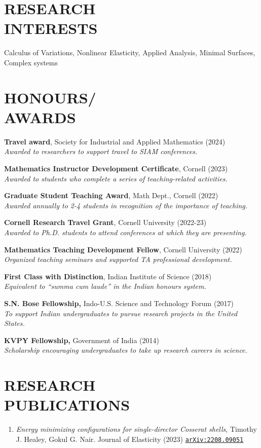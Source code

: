 \documentclass[margin]{res} %
\begin{document}
\begin{resume}
\section{RESEARCH \\ INTERESTS} 

Calculus of Variations, Nonlinear Elasticity, Applied Analysis, Minimal Surfaces, Complex systems 
 
\section{HONOURS/\\AWARDS}
{\bf Travel award}, Society for Industrial and Applied Mathematics (2024)\\
\textit{Awarded to researchers to support travel to SIAM conferences.}

{\bf Mathematics Instructor Development Certificate}, Cornell (2023)\\
\textit{Awarded to students who complete a series of teaching-related activities.}

{\bf Graduate Student Teaching Award}, Math Dept., Cornell (2022)\\
\textit{Awarded annually to 2-4 students in recognition of the importance of teaching. }

{\bf Cornell Research Travel Grant}, Cornell University (2022-23)\\
\textit{Awarded to Ph.D. students to attend conferences at which they are presenting.}

{\bf Mathematics Teaching Development Fellow}, Cornell University (2022)\\
\textit{Organized teaching seminars and supported TA professional development.}

{\bf First Class with Distinction}, Indian Institute of Science (2018)\\
\textit{Equivalent to ``summa cum laude'' in the Indian honours system.}

{\bf S.N. Bose Fellowship,} Indo-U.S. Science and Technology Forum (2017)\\
\textit{To support Indian undergraduates to pursue research projects in the United States.}

{\bf KVPY Fellowship,} Government of India (2014)\\
\textit{Scholarship encouraging undergraduates to take up research careers in science.}

\section{RESEARCH\\PUBLICATIONS}
\begin{enumerate}
	\item {\sl Energy minimizing configurations for single-director Cosserat shells}, Timothy J. Healey, Gokul G. Nair. Journal of Elasticity (2023) \href{https://arxiv.org/abs/2208.09051}{\texttt{arXiv:2208.09051}}


\end{enumerate}
\end{resume}
\end{document}
